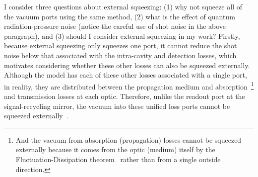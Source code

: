 I consider three questions about external squeezing: (1) why not squeeze all of the vacuum ports using the same method, (2) what is the effect of quantum radiation-pressure noise (notice the careful use of shot noise in the above paragraph), and (3) should I consider external squeezing in my work?
Firstly, because external squeezing only squeezes one port, it cannot reduce the shot noise below that associated with the intra-cavity and detection losses, which motivates considering whether these other losses can also be squeezed externally. Although the model has each of these other losses associated with a single port, in reality, they are distributed between the propagation medium and absorption~\footnote{And the vacuum from absorption (propagation) losses cannot be squeezed externally because it comes from the optic (medium) itself by the Fluctuation-Dissipation theorem~\cite{} rather than from a single outside direction.} and transmission  losses at each optic. Therefore, unlike the readout port at the signal-recycling mirror, the vacuum into these unified loss ports cannot be squeezed externally~\cite{}. 
